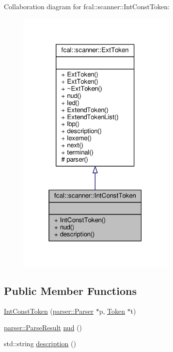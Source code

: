 Collaboration diagram for fcal\+:\+:scanner\+:\+:Int\+Const\+Token\+:
\nopagebreak
\begin{figure}[H]
\begin{center}
\leavevmode
\includegraphics[width=223pt]{classfcal_1_1scanner_1_1IntConstToken__coll__graph}
\end{center}
\end{figure}
\subsection*{Public Member Functions}
\begin{DoxyCompactItemize}
\item 
\hyperlink{classfcal_1_1scanner_1_1IntConstToken_a2846b99b9b48717e35d81446618eb924}{Int\+Const\+Token} (\hyperlink{classfcal_1_1parser_1_1Parser}{parser\+::\+Parser} $\ast$p, \hyperlink{classfcal_1_1scanner_1_1Token}{Token} $\ast$t)
\item 
\hyperlink{classfcal_1_1parser_1_1ParseResult}{parser\+::\+Parse\+Result} \hyperlink{classfcal_1_1scanner_1_1IntConstToken_aede9ed23780dbb33a7852b3ecf6183da}{nud} ()
\item 
std\+::string \hyperlink{classfcal_1_1scanner_1_1IntConstToken_a9359c997cac9cf57a5c7debc6a1811ab}{description} ()
\end{DoxyCompactItemize}
